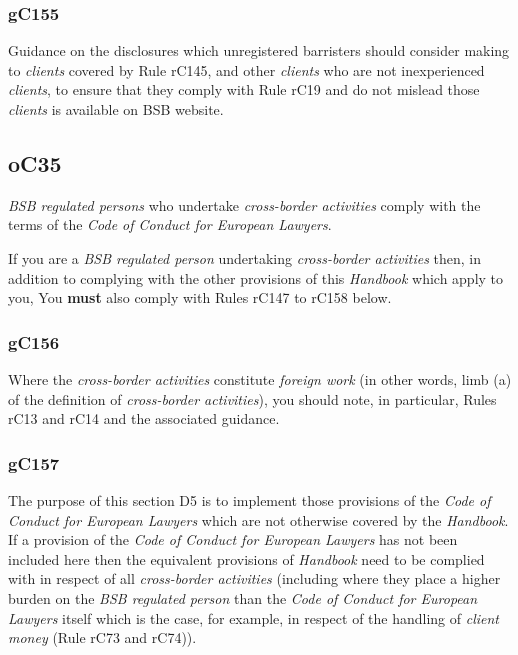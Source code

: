 \subsubsection{\color{darkgrey}gC155}

Guidance on the disclosures which unregistered barristers should
consider making to \emph{clients} covered by Rule rC145, and other
\emph{clients} who are not inexperienced \emph{clients}, to ensure that
they comply with Rule rC19 and do not mislead those \emph{clients} is
available on BSB website.






\subsection{\color{bleu}oC35}

\emph{BSB regulated persons} who undertake \emph{cross-border
activities} comply with the terms of the \emph{Code of Conduct for
European Lawyers}.




If you are a \emph{BSB regulated person} undertaking \emph{cross-border
activities} then, in addition to complying with the other provisions of
this \emph{Handbook} which apply to you, You \textcolor{myred}{\textbf{must}} also comply with Rules
rC147 to rC158 below.




\subsubsection{\color{darkgrey}gC156}

Where the \emph{cross-border activities} constitute \emph{foreign work}
(in other words, limb (a) of the definition of \emph{cross-border
activities}), you should note, in particular, Rules rC13 and rC14 and
the associated guidance.

\subsubsection{\color{darkgrey}gC157}

The purpose of this section D5 is to implement those provisions of the
\emph{Code of Conduct for European Lawyers} which are not otherwise
covered by the \emph{Handbook}. If a provision of the \emph{Code of
Conduct for European Lawyers} has not been included here then the
equivalent provisions of \emph{Handbook} need to be complied with in
respect of all \emph{cross-border activities} (including where they
place a higher burden on the \emph{BSB regulated person} than the
\emph{Code of Conduct for European Lawyers} itself which is the case,
for example, in respect of the handling of \emph{client money} (Rule
rC73 and rC74)).

